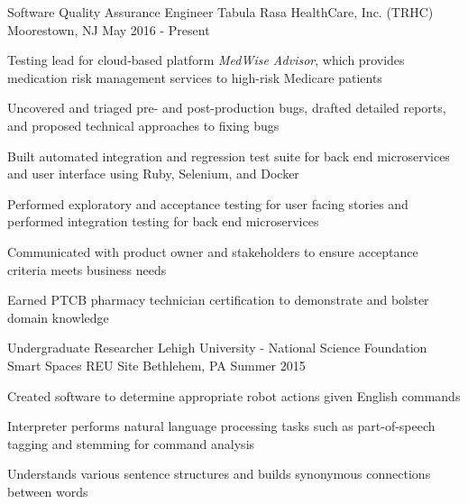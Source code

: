 

\begin{cventries}

  \cventry
    {Software Quality Assurance Engineer} %
    {Tabula Rasa HealthCare, Inc. (TRHC)} %
    {Moorestown, NJ} %
    {May 2016 - Present} %
    {
      \begin{cvitems} %
      \item {Testing lead for cloud-based platform \emph{MedWise Advisor}, which provides medication risk management services to high-risk Medicare patients}
        \item {Uncovered and triaged pre- and post-production bugs, drafted detailed reports, and proposed technical approaches to fixing bugs}
        \item {Built automated integration and regression test suite for back end microservices and user interface using Ruby, Selenium, and Docker}
        \item {Performed exploratory and acceptance testing for user facing stories and performed integration testing for back end microservices}
        \item {Communicated with product owner and stakeholders to ensure acceptance criteria meets business needs}
        \item {Earned PTCB pharmacy technician certification to demonstrate and bolster domain knowledge}
      \end{cvitems}
    }

  \cventry
    {Undergraduate Researcher} %
    {Lehigh University - National Science Foundation Smart Spaces REU Site} %
    {Bethlehem, PA} %
    {Summer 2015} %
    {
      \begin{cvitems} %
        \item {Created software to determine appropriate robot actions given English commands}
        \item {Interpreter performs natural language processing tasks such as part-of-speech tagging and stemming for command analysis}
        \item {Understands various sentence structures and builds synonymous connections between words}
      \end{cvitems}
    }


\end{cventries}
